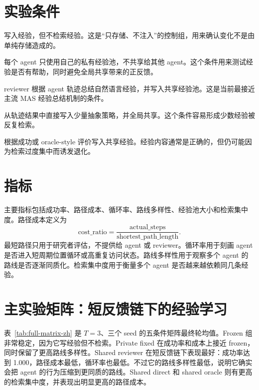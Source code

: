 \documentclass[UTF8,11pt]{ctexart}
\begin{document}
\section{实验条件}

\begin{description}[leftmargin=2.6cm, style=nextline]
    \item[Frozen] 写入经验，但不检索经验。这是“只存储、不注入”的控制组，用来确认变化不是由单纯存储造成的。
    \item[Private fixed] 每个 agent 只使用自己的私有经验池，不共享给其他 agent。这个条件用来测试经验是否有帮助，同时避免全局共享带来的正反馈。
    \item[Shared reviewer] reviewer 根据 agent 轨迹总结自然语言经验，并写入共享经验池。这是当前最接近主流 MAS 经验总结机制的条件。
    \item[Shared direct] 从轨迹结果中直接写入少量抽象策略，并全局共享。这个条件容易形成少数经验被反复检索。
    \item[Shared oracle] 根据成功或 oracle-style 评价写入共享经验。经验内容通常是正确的，但仍可能因为检索过度集中而诱发退化。
\end{description}

\section{指标}

主要指标包括成功率、路径成本、循环率、路线多样性、经验池大小和检索集中度。路径成本定义为
\[
    \mathrm{cost\_ratio} = \frac{\mathrm{actual\_steps}}{\mathrm{shortest\_path\_length}}.
\]
最短路径只用于研究者评估，不提供给 agent 或 reviewer。循环率用于刻画 agent 是否进入短周期位置循环或高重复访问状态。路线多样性用于观察多个 agent 的路线是否逐渐同质化。检索集中度用于衡量多个 agent 是否越来越依赖同几条经验。

\section{主实验矩阵：短反馈链下的经验学习}

表~\ref{tab:full-matrix-zh} 是 $T=3$、三个 seed 的五条件矩阵最终轮均值。Frozen 组非常稳定，因为它写经验但不检索。Private fixed 在成功率和成本上接近 frozen，同时保留了更高路线多样性。Shared reviewer 在短反馈链下表现最好：成功率达到 1.000，路径成本最低，循环率也最低。不过它的路线多样性最低，说明它确实会把 agent 的行为压缩到更同质的路线。Shared direct 和 shared oracle 则有更高的检索集中度，并表现出明显更高的路径成本。
\end{document}
